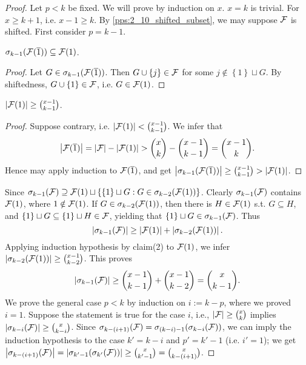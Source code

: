 \begin{proof}
    Let $p<k$ be fixed. We will prove by induction on $x$. $x=k$ is trivial. For $x\geq k+1$, i.e. $x-1\geq k$. By \cref{pps:2_10_shifted_subset}, we may suppose $\mathcal{F}$ is shifted. First consider $p=k-1$. 

    \begin{claim}[clm:]{}
        $\sigma_{k-1}(\mathcal{F}(\overline{1}))\subseteq \mathcal{F}(1)$.
        \tcblower
        \begin{proof}
            Let $G\in \sigma_{k-1}(\mathcal{F}(\overline{1}))$. Then $G\cup \left\{j\right\}\in \mathcal{F}$ for some $j\notin \left\{1\right\}\sqcup G$. By shiftedness, $G\cup \left\{1\right\}\in \mathcal{F}$, i.e. $G\in \mathcal{F}(1)$.
        \end{proof}
    \end{claim}
    \begin{claim}[clm:]{}
        $\left|\mathcal{F}(1)\right|\geq {x-1\choose k-1}$.
        \tcblower
        \begin{proof}
            Suppose contrary, i.e. $\left|\mathcal{F}(1)\right|<{x-1\choose k-1}$. We infer that
            \[\left|\FF(\overline{1})\right|=\left|\FF\right|-\left|\FF(1)\right|>{x\choose k}-{x-1\choose k-1}={x-1\choose k}.\]
            Hence may apply induction to $\mathcal{F}(\overline{1})$, and get $\left|\sigma_{k-1}(\mathcal{F}(\overline{1}))\right|\geq {x-1\choose k-1}>\left|\mathcal{F}(1)\right|$.
        \end{proof}
    \end{claim}
    Since $\sigma_{k-1}(\mathcal{F})\supseteq \mathcal{F}(1)\sqcup\left\{\left\{1\right\}\sqcup G:G\in \sigma_{k-2}(\mathcal{F}(1))\right\}$. Clearly $\sigma_{k-1}(\mathcal{F})$ contains $\mathcal{F}(1)$, where $1\notin \mathcal{F}(1)$. If $G\in \sigma_{k-2}(\mathcal{F}(1))$, then there is $H\in \mathcal{F}(1)$ s.t. $G\subseteq H$, and $\left\{1\right\}\sqcup G\subseteq \left\{1\right\}\sqcup H\in \mathcal{F}$,  yielding that $\left\{1\right\}\sqcup G \in \sigma_{k-1}(\mathcal{F})$. Thus
    \[\left|\sigma_{k-1}(\mathcal{F})\right|\geq \left|\mathcal{F}(1)\right|+\left|\sigma_{k-2}(\mathcal{F}(1))\right|.\]
    Applying induction hypothesis by claim(2) to $\mathcal{F}(1)$, we infer $\left|\sigma_{k-2}(\mathcal{F}(1))\right|\geq {x-1\choose k-2}$. This proves
    \[\left|\sigma_{k-1}(\mathcal{F})\right|\geq {x-1\choose k-1}+{x-1\choose k-2}={x\choose k-1}.\]
    We prove the general case $p<k$ by induction on $i:=k-p$, where we proved $i=1$. Suppose the statement is true for the case $i$, i.e., $\left|\mathcal{F}\right|\geq {x\choose k}$ implies $\left|\sigma_{k-i}(\mathcal{F})\right|\geq {x\choose k-i}$. Since $\sigma_{k-(i+1)}(\mathcal{F})=\sigma_{(k-i)-1}(\sigma_{k-i}(\mathcal{F}))$, we can imply the induction hypothesis to the case $k'=k-i$ and $p'=k'-1$ (i.e. $i'=1$); we get $\left|\sigma_{k-(i+1)}(\mathcal{F})\right|=\left|\sigma_{k'-1}(\sigma_{k'}(\mathcal{F}))\right|\geq {x\choose k'-1}={x\choose k-(i+1)}$.
\end{proof}

